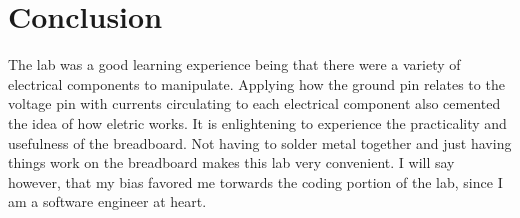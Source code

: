 \documentclass{article}
\begin{document}
\section{Conclusion}
The lab was a good learning experience being that there were a variety of electrical components to manipulate. Applying how the ground pin relates to the voltage pin with currents circulating to each electrical component also cemented the idea of how eletric works. It is enlightening to experience the practicality and usefulness of the breadboard. Not having to solder metal together and just having things work on the breadboard makes this lab very convenient. I will say however, that my bias favored me torwards the coding portion of the lab, since I am a software engineer at heart.
\end{document}

